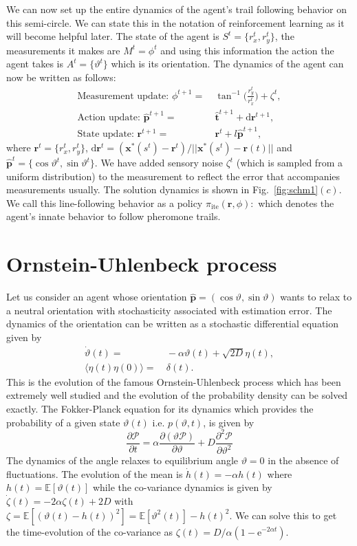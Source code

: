 \documentclass[%
reprint,
superscriptaddress,
floatfix,
amsmath,
amssymb,
aps,
notitlepage
]{revtex4-1}
\def\d{\text{d}}
\def\e{\text{e}}
\def\r{\mathbf{r}}
\def\xst{\mathbf{x}^*}
\def\E{\mathbb{E}}
\def\th{\hat{\mathbf{t}}}
\def\ph{\hat{\mathbf{p}}}
\def\ite{\text{ite}}
\def\P{\mathcal{P}}
\def\theta{\vartheta}
\begin{document}
We can now set up the entire dynamics of the agent's trail following behavior on this semi-circle. We can state this
in the notation of reinforcement learning as it will become helpful later. The state of the agent
is $S^t = \{ r_x^t, r_y^t \}$, the measurements it makes are $M^t = \phi^t$ and using this information
the action the agent takes is $A^t = \{ \theta^t \}$ which is its orientation. The dynamics of
the agent can now be written as follows:
\begin{align}
    \text{Measurement update: } \phi^{t+1} = & \ \tan^{-1} \bigg( \frac{r_y^t}{r_x^t} \bigg) + \zeta^t, \\
    \text{Action update: }\ph^{t+1} =& \ \th^{t+1} + \d\r^{t+1}, \\
    \text{State update: } \r^{t+1} =& \ \r^t + l \ph^{t+1},
\end{align}
where $\r^t = \{ r_x^t, r_y^t \}$, $\d\r^t = (\xst(s^t)-\r^t)/||\xst(s^t)-\r(t)||$ and $\ph^t = \{ \cos \theta^t, \sin \theta^t \}$.
We have added sensory noise $\zeta^t$ (which is sampled from a uniform distribution) to the measurement
to reflect the error that accompanies measurements usually. The solution dynamics is shown
in Fig.~\ref{fig:schm1}$(c)$. We call this line-following behavior as a policy
$\pi_\ite(\r, \phi): $
which denotes the agent's innate behavior to follow pheromone trails.

\section{Ornstein-Uhlenbeck process}

Let us consider an agent whose orientation $\ph = ( \cos \theta, \sin \theta)$ wants to relax to a
neutral orientation with stochasticity associated with estimation error. The dynamics of the orientation
can be written as a stochastic differential equation given by
\begin{align}
    \dot{\theta}(t) =& \ - \alpha \theta(t) + \sqrt{2 D} \eta(t), \\
    \langle \eta(t) \eta(0) \rangle =& \ \delta(t).
\end{align}
This is the evolution of the famous Ornstein-Uhlenbeck process which has been extremely well studied
and the evolution of the probability density can be solved exactly. The Fokker-Planck equation for
its dynamics which provides the probability of a given state $\theta(t)$ i.e. $p(\theta, t)$, is given by
\[
    \frac{\partial \P}{\partial t} = \alpha \frac{\partial(\theta \P)}{\partial \theta }
    + D \frac{\partial^2 \P}{\partial \theta^2}
\]
The dynamics of the angle relaxes to equilibrium angle $\theta = 0$ in the absence of fluctuations.
The evolution of the mean is $\dot{h}(t) = - \alpha h(t)$ where $h(t) = \E [ \theta(t) ]$
while the co-variance dynamics is given by $\dot{\zeta}(t) = -2\alpha \zeta(t) + 2D$ with
$\zeta = \E [  {(\theta(t) - h(t))}^2 ] = \E [  \theta^2(t) ] - h{(t)}^2$. We can solve this to get
the time-evolution of the co-variance as $\zeta(t) = D/\alpha(1-\e^{-2\alpha t})$.
\end{document}
